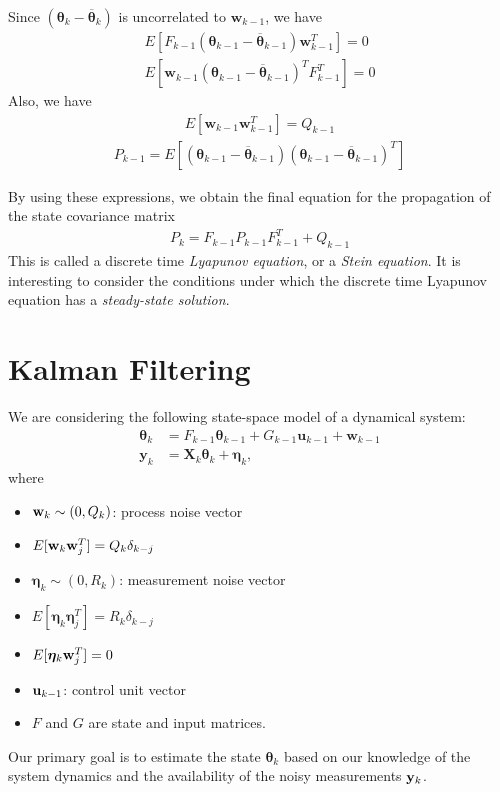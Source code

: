 Since $(\boldsymbol{\theta}_{k}-\overline{\boldsymbol{\theta}}_{k})$ is uncorrelated to $\mathbf{w}_{k-1}$, we have
\begin{align*}
	E[F_{k-1}(\boldsymbol{\theta}_{k-1}-\overline{\boldsymbol{\theta}}_{k-1})\mathbf{w}_{k-1}^{T}]=0 \\E[\mathbf{w}_{k-1}(\boldsymbol{\theta}_{k-1}-\overline{\boldsymbol{\theta}}_{k-1})^{T}F_{k-1}^{T}]=0
\end{align*}
Also, we have
\begin{align*}
	E[\mathbf{w}_{k-1}\mathbf{w}_{k-1}^{T}]=Q_{k-1}
\end{align*}
\begin{align*}
	P_{k-1}=E[(\boldsymbol{\theta}_{k-1}-\overline{\boldsymbol{\theta}}_{k-1})(\boldsymbol{\theta}_{k-1}-\overline{\boldsymbol{\theta}}_{k-1})^{T}]
\end{align*}

By using these expressions, we obtain the final equation for the propagation of the state covariance matrix
\begin{align*}
	P_{k}=F_{k-1}P_{k-1}F_{k-1}^{T}+Q_{k-1}
\end{align*}
This is called a discrete time \textit{Lyapunov equation}, or a \textit{Stein equation}. It is interesting to consider the conditions under which the discrete time Lyapunov equation has a \textit{steady-state solution}. 


\section{Kalman Filtering}
We are considering the following state-space model of a dynamical system:
\begin{align*}
	\boldsymbol{\theta}_{k}&=F_{k-1}\boldsymbol{\theta}_{k-1}+G_{k-1}\mathbf{u}_{k-1}+\mathbf{w}_{k-1} \\
	\mathbf{y}_{k}& = \mathbf{X}_{k}\boldsymbol{\theta}_{k}+\boldsymbol{\eta}_{k},
\end{align*}
where
\begin{itemize}
	\item ${\mathbf{w}}_{k}\sim (0, Q_k)$: process noise vector
	\item $E[{\mathbf{w}}_k{\mathbf{w}}_j^T] = Q_k\delta_{k-j}$
	\item $\boldsymbol{\eta}_{k}\sim (0, R_k)$: measurement noise vector
	\item $E[\boldsymbol{\eta}_k\boldsymbol{\eta}_j^T] = R_k\delta_{k-j}$
	\item $E[\boldsymbol{\eta}_k{\mathbf{w}}_j^T] = 0$
	\item ${\mathbf{u}}_{k-1}$: control unit vector
	\item $F$ and $G$ are state and input matrices.
\end{itemize}
Our primary goal is to estimate the state $\boldsymbol{\theta}_k$ based on our knowledge of the system dynamics and the availability of the noisy measurements ${{\mathbf{y}}_k}$.

